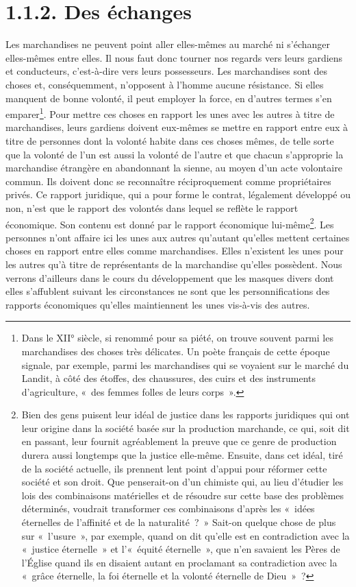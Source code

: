 \documentclass[french,twoside]{book} %
\begin{document}
\section[{1.1.2. Des échanges}]{1.1.2. Des échanges}\renewcommand{\leftmark}{1.1.2. Des échanges}

\noindent Les marchandises ne peuvent point aller elles-mêmes au marché ni s’échanger elles-mêmes entre elles. Il nous faut donc tourner nos regards vers leurs gardiens et conducteurs, c’est-à-dire vers leurs possesseurs. Les marchandises sont des choses et, conséquemment, n’opposent à l’homme aucune résistance. Si elles manquent de bonne volonté, il peut employer la force, en d’autres termes s’en emparer\footnote{Dans le XII° siècle, si renommé pour sa piété, on trouve souvent parmi les marchandises des choses très délicates. Un poète français de cette époque signale, par exemple, parmi les marchandises qui se voyaient sur le marché du Landit, à côté des étoffes, des chaussures, des cuirs et des instruments d’agriculture, « des femmes folles de leurs corps ».}. Pour mettre ces choses en rapport les unes avec les autres à titre de marchandises, leurs gardiens doivent eux-mêmes se mettre en rapport entre eux à titre de personnes dont la volonté habite dans ces choses mêmes, de telle sorte que la volonté de l’un est aussi la volonté de l’autre et que chacun s’approprie la marchandise étrangère en abandonnant la sienne, au moyen d’un acte volontaire commun. Ils doivent donc se reconnaître réciproquement comme propriétaires privés. Ce rapport juridique, qui a pour forme le contrat, légalement développé ou non, n’est que le rapport des volontés dans lequel se reflète le rapport économique. Son contenu est donné par le rapport économique lui-même\footnote{Bien des gens puisent leur idéal de justice dans les rapports juridiques qui ont leur origine dans la société basée sur la production marchande, ce qui, soit dit en passant, leur fournit agréablement la preuve que ce genre de production durera aussi longtemps que la justice elle-même. Ensuite, dans cet idéal, tiré de la société actuelle, ils prennent lent point d’appui pour réformer cette société et son droit. Que penserait-on d’un chimiste qui, au lieu d’étudier les lois des combinaisons matérielles et de résoudre sur cette base des problèmes déterminés, voudrait transformer ces combinaisons d’après les « idées éternelles de l’affinité et de la naturalité ? » Sait-on quelque chose de plus sur « l’usure », par exemple, quand on dit qu’elle est en contradiction avec la « justice éternelle » et l’« équité éternelle », que n’en savaient les Pères de l’Église quand ils en disaient autant en proclamant sa contradiction avec la « grâce éternelle, la foi éternelle et la volonté éternelle de Dieu » ?}. Les personnes n’ont affaire ici les unes aux autres qu’autant qu’elles mettent certaines choses en rapport entre elles comme marchandises. Elles n’existent les unes pour les autres qu’à titre de représentants de la marchandise qu’elles possèdent. Nous verrons d’ailleurs dans le cours du développement que les masques divers dont elles s’affublent suivant les circonstances ne sont que les personnifications des rapports économiques qu’elles maintiennent les unes vis-à-vis des autres.\par
\end{document}
